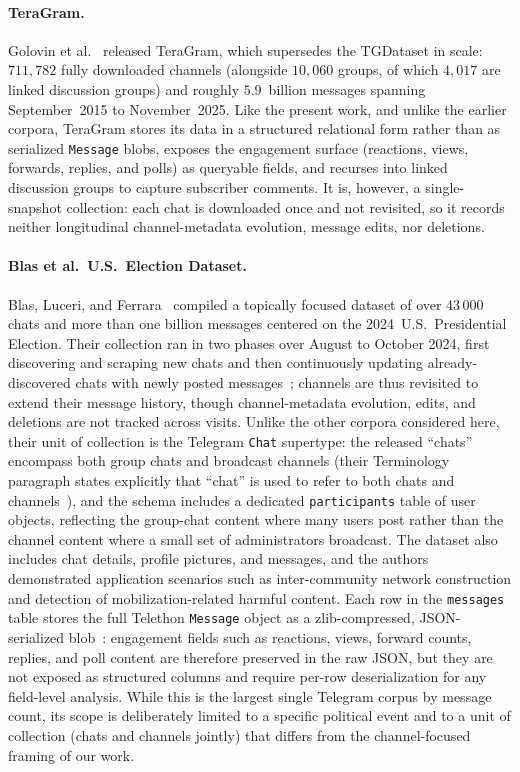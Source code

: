 \paragraph{TeraGram.}
Golovin et al.~\cite{teragram2026} released TeraGram, which supersedes the TGDataset in scale: $711{,}782$ fully downloaded channels (alongside $10{,}060$ groups, of which $4{,}017$ are linked discussion groups) and roughly $5.9$~billion messages spanning September~2015 to November~2025.
Like the present work, and unlike the earlier corpora, TeraGram stores its data in a structured relational form rather than as serialized \texttt{Message} blobs, exposes the engagement surface (reactions, views, forwards, replies, and polls) as queryable fields, and recurses into linked discussion groups to capture subscriber comments.
It is, however, a single-snapshot collection: each chat is downloaded once and not revisited, so it records neither longitudinal channel-metadata evolution, message edits, nor deletions.

\paragraph{Blas et al.\ U.S.\ Election Dataset.}
Blas, Luceri, and Ferrara~\cite{blas2025} compiled a topically focused dataset of over 43\,000 chats and more than one billion messages centered on the 2024~U.S.\ Presidential Election.
Their collection ran in two phases over August to October 2024, first discovering and scraping new chats and then continuously updating already-discovered chats with newly posted messages~\cite{blas2025}; channels are thus revisited to extend their message history, though channel-metadata evolution, edits, and deletions are not tracked across visits.
Unlike the other corpora considered here, their unit of collection is the Telegram \texttt{Chat} supertype: the released ``chats'' encompass both group chats and broadcast channels (their Terminology paragraph states explicitly that ``chat'' is used to refer to both chats and channels~\cite{blas2025}), and the schema includes a dedicated \texttt{participants} table of user objects, reflecting the group-chat content where many users post rather than the channel content where a small set of administrators broadcast.
The dataset also includes chat details, profile pictures, and messages, and the authors demonstrated application scenarios such as inter-community network construction and detection of mobilization-related harmful content.
Each row in the \texttt{messages} table stores the full Telethon \texttt{Message} object as a zlib-compressed, JSON-serialized blob~\cite{blas2025}: engagement fields such as reactions, views, forward counts, replies, and poll content are therefore preserved in the raw JSON, but they are not exposed as structured columns and require per-row deserialization for any field-level analysis.
While this is the largest single Telegram corpus by message count, its scope is deliberately limited to a specific political event and to a unit of collection (chats and channels jointly) that differs from the channel-focused framing of our work.

